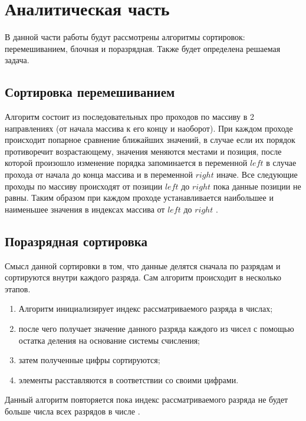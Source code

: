 \chapter{Аналитическая часть}
В данной части работы будут рассмотрены алгоритмы сортировок: перемешиванием, блочная и поразрядная. Также будет определена решаемая задача.






\section{Сортировка перемешиванием}
Алгоритм состоит из последовательных про проходов по массиву в 2 направлениях (от начала массива к его концу и наоборот). При каждом проходе 
происходит попарное сравнение ближайших значений, в случае если их порядок противоречит возрастающему, значения меняются местами и позиция,
после которой произошло изменение порядка запоминается в переменной $left$ в случае прохода от начала до конца массива и в переменной $right$ иначе.
Все следующие проходы по массиву происходят от позиции $left$ до $right$ пока данные позиции не равны. Таким образом при каждом проходе устанавливается
наибольшее и наименьшее значения в индексах массива от $left$ до $right$ \cite{conctail_sort,article_sorts}.

\section{Поразрядная сортировка}
Смысл данной сортировки в том, что данные делятся сначала по разрядам и сортируются внутри каждого разряда.
Сам алгоритм происходит в несколько этапов.
\begin{enumerate}
	\item Алгоритм инициализирует индекс рассматриваемого разряда в числах;
	\item после чего получает значение данного разряда каждого из чисел с помощью остатка деления на основание системы счисления;
	\item затем полученные цифры сортируются;
	\item элементы расставляются в соответствии со своими цифрами.
\end{enumerate}
Данный алгоритм повторяется пока индекс рассматриваемого разряда не будет больше числа всех разрядов в числе \cite{book_knut,article_sorts}.

